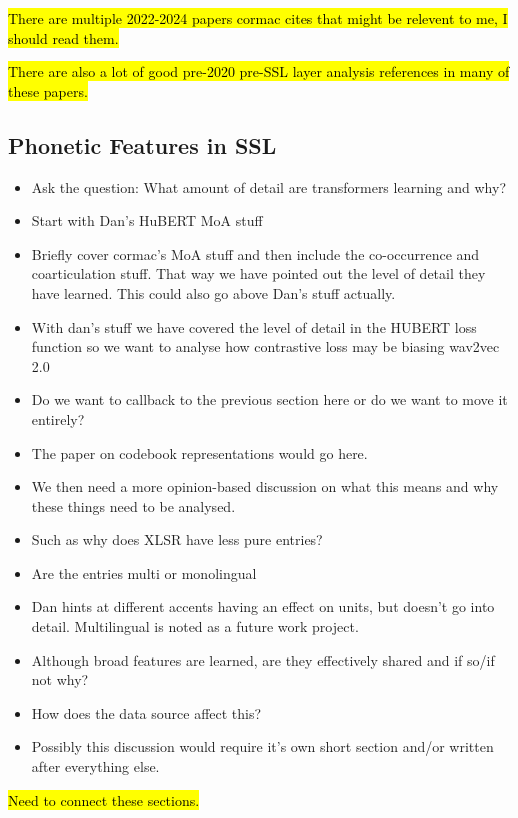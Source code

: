 \hl{There are multiple 2022-2024 papers cormac cites that might be relevent to me, I should read them.}

\hl{There are also a lot of good pre-2020 pre-SSL layer analysis references in many of these papers.}


\subsection{Phonetic Features in SSL}
\begin{itemize}
    \item Ask the question: What amount of detail are transformers learning and why?
    \item Start with Dan's HuBERT MoA stuff
    \item Briefly cover cormac's MoA stuff and then include the co-occurrence and coarticulation stuff. That way we have pointed out the level of detail they have learned. This could also go above Dan's stuff actually.
    \item With dan's stuff we have covered the level of detail in the HUBERT loss function so we want to analyse how contrastive loss may be biasing wav2vec 2.0
    \item Do we want to callback to the previous section here or do we want to move it entirely?
    \item The paper on codebook representations would go here.
    \item We then need a more opinion-based discussion on what this means and why these things need to be analysed. 
    \item Such as why does XLSR have less pure entries?
    \item Are the entries multi or monolingual
    \item Dan hints at different accents having an effect on units, but doesn't go into detail. Multilingual is noted as a future work project.
    \item Although broad features are learned, are they effectively shared and if so/if not why?
    \item How does the data source affect this?
    \item Possibly this discussion would require it's own short section and/or written after everything else.
\end{itemize}

\hl{Need to connect these sections.}


